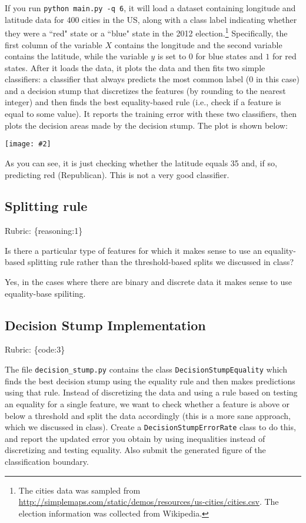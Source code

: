 \documentclass{article}
\def\rubric#1{\gre{Rubric: \{#1\}}}{}
\def\blu#1{{\color{blu}#1}}
\def\gre#1{{\color{gre}#1}}
\newcommand{\centerfig}[2]{\begin{center}\texttt{[image: \#2]}\end{center}}
\begin{document}
\begin{enumerate}
If you run \texttt{python main.py -q 6}, it will load a dataset containing longitude 
and latitude data for 400 cities in the US, along with a class label indicating
 whether they were a ``red" state or a ``blue" state in the 2012 
 election.\footnote{The cities data was sampled from \url{http://simplemaps.com/static/demos/resources/us-cities/cities.csv}. The election information was collected from Wikipedia.}
Specifically, the first column of the variable $X$ contains the 
longitude and the second variable contains the latitude,
while the variable $y$ is set to $0$ for blue states and $1$ for red states.
After it loads the data, it plots the data and then fits two simple 
classifiers: a classifier that always predicts the
most common label ($0$ in this case) and a decision stump
that discretizes the features (by rounding to the nearest integer)
and then finds the best equality-based rule (i.e., check
 if a feature is equal to some value).
It reports the training error with these two classifiers, then plots the decision areas made by the decision stump.
The plot is shown below:

\centerfig{0.7}{../figs/q6_decisionBoundary}

As you can see, it is just checking whether the latitude equals 35 and, if so, predicting red (Republican).
This is not a very good classifier. 

\subsection{Splitting rule}
\rubric{reasoning:1}

Is there a particular type of features for which it makes sense to use an equality-based splitting rule rather than the threshold-based splits we discussed in class?
\begin{center}\color{blu} Yes, in the cases where there are binary and discrete data it makes sense to use equality-base spiliting. \end{center}

\subsection{Decision Stump Implementation}
\rubric{code:3}

The file \texttt{decision\string_stump.py} contains the class \texttt{DecisionStumpEquality} which 
finds the best decision stump using the equality rule and then makes predictions using that
rule. Instead of discretizing the data and using a rule based on testing an equality for 
a single feature, we want to check whether a feature is above or below a threshold and 
split the data accordingly (this is a more sane approach, which we discussed in class). 
\blu{Create a \texttt{DecisionStumpErrorRate} class to do this, and report the updated error you 
obtain by using inequalities instead of discretizing and testing equality. Also submit the generated figure of the classification boundary.}


\end{enumerate}
\end{document}
